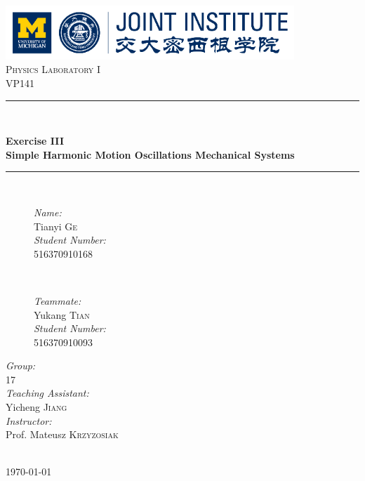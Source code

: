 \begin{titlepage}

\newcommand{\HRule}{\rule{\linewidth}{0.5mm}}

\center

\includegraphics[height=0.8in]{images/logo.png}\\[1cm]

\textsc{\Large Physics Laboratory I}\\[0.4cm]
\textsc{\large VP141}\\[0.4cm]

\HRule \\[0.4cm]
{
    \bfseries
    {\huge Exercise III}\\[0.3cm]
    {\large Simple Harmonic Motion Oscillations Mechanical Systems}\\[0.2cm]
    \HRule \\[1.5cm]
}
\begin{figure}[h]
    \hspace{3cm}
    \begin{minipage}{0.4\textwidth}
        \large
        \emph{Name:}\\
        Tianyi \textsc{Ge} \\

        \emph{Student Number:}\\
        516370910168
    \end{minipage}
    ~
    \begin{minipage}{0.4\textwidth}
        \large
        \emph{Teammate:}\\
        Yukang \textsc{Tian} \\

        \emph{Student Number:}\\
        516370910093
    \end{minipage}
\end{figure}

\vspace{1cm}

\begin{minipage}{0.4\textwidth}
    \large
    \emph{Group:}\\
    17\\

    \emph{Teaching Assistant:}\\
    Yicheng \textsc{Jiang}\\

    \emph{Instructor:}\\
    Prof. Mateusz \textsc{Krzyzosiak}
\end{minipage}\\[2cm]

{\large \today}\\[2cm]

\vfill

\end{titlepage}

\tableofcontents
\clearpage
